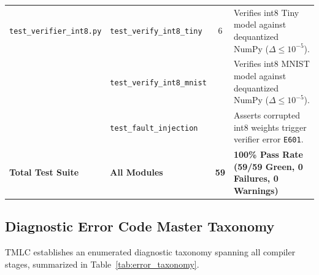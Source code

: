 \documentclass[11pt,a4paper]{article}
\begin{document}
\begin{table}[htbp]
\begin{tabular}{llcp{7.2cm}}
\midrule
\texttt{test\_verifier\_int8.py}& \texttt{test\_verify\_int8\_tiny} & 6 & Verifies int8 Tiny model against dequantized NumPy ($\Delta \le 10^{-5}$). \\
                                 & \texttt{test\_verify\_int8\_mnist}& & Verifies int8 MNIST model against dequantized NumPy ($\Delta \le 10^{-5}$). \\
                                 & \texttt{test\_fault\_injection}   & & Asserts corrupted int8 weights trigger verifier error \texttt{E601}. \\
\midrule
\textbf{Total Test Suite} & \textbf{All Modules} & \textbf{59} & \textbf{100\% Pass Rate (59/59 Green, 0 Failures, 0 Warnings)} \\
\bottomrule
\end{tabular}
\end{table}

\subsection{Diagnostic Error Code Master Taxonomy}
TMLC establishes an enumerated diagnostic taxonomy spanning all compiler stages, summarized in Table~\ref{tab:error_taxonomy}.
\end{document}
